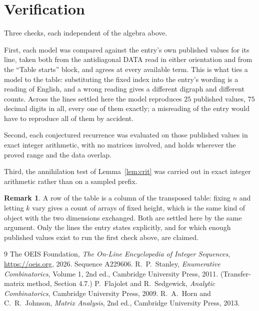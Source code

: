 \documentclass[11pt,a4paper]{article}
\theoremstyle{plain}
\theoremstyle{definition}
\newtheorem{remark}[theorem]{Remark}
\begin{document}
\section{Verification}

Three checks, each independent of the algebra above.

First, each model was compared against the entry's own published values for its line, taken
both from the antidiagonal DATA read in either orientation and from the ``Table starts''
block, and agrees at every available term. This is what ties a model to the table:
substituting the fixed index into the entry's wording is a reading of English, and a wrong
reading gives a different digraph and different counts. Across the lines settled here the
model reproduces $25$ published values, $75$ decimal digits in all, every one of
them exactly; a misreading of the entry would have to reproduce all of them by accident.

Second, each conjectured recurrence was evaluated on those published values in exact
integer arithmetic, with no matrices involved, and holds wherever the proved range and the
data overlap.

Third, the annihilation test of Lemma~\ref{lem:crit} was carried out in exact integer
arithmetic rather than on a sampled prefix.

\begin{remark}
A row of the table is a column of the transposed table: fixing $n$ and letting $k$ vary gives a
count of arrays of fixed height, which is the same kind of object with the two dimensions
exchanged. Both are settled here by the same argument. Only the lines the entry states
explicitly, and for which enough published values exist to run the first check above, are
claimed.
\end{remark}

\begin{thebibliography}{9}
 The OEIS Foundation, \emph{The On-Line Encyclopedia of Integer
Sequences}, \url{https://oeis.org}, 2026. Sequence A229606.
 R.~P.~Stanley, \emph{Enumerative Combinatorics}, Volume 1, 2nd ed.,
Cambridge University Press, 2011. (Transfer-matrix method, Section 4.7.)
 P.~Flajolet and R.~Sedgewick, \emph{Analytic Combinatorics}, Cambridge
University Press, 2009.
 R.~A.~Horn and C.~R.~Johnson, \emph{Matrix Analysis}, 2nd ed., Cambridge
University Press, 2013.
\end{thebibliography}
\end{document}
